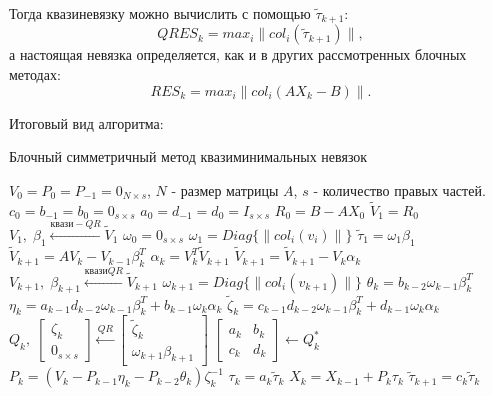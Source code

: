 Тогда квазиневязку можно вычислить с помощью $\tilde{\tau}_{k+1}$:
$$QRES_k = max_i \| col_i (\tilde{\tau}_{k+1}) \|,$$
а настоящая невязка определяется, как и в других рассмотренных блочных методах:
$$RES_k = max_i \| col_i (AX_k - B) \|.$$

Итоговый вид алгоритма:
\begin{algorithm}[H]
    \caption{Блочный симметричный метод квазиминимальных невязок}
    \begin{algorithmic}[1]
        \State $V_0 = P_{0} = P_{-1} = 0_{N \times s}$, $N$ - размер матрицы $A$, $s$ - количество правых частей.
        \State $c_0 = b_{-1} = b_0 = 0_{s \times s}$
        \State $a_0 = d_{-1} = d_0 = I_{s \times s}$
        \State $R_0 = B - AX_0$
        \State $\tilde{V}_1 = R_0$
        \State $V_1,\; \beta_1 \xleftarrow{квази-QR} \tilde{V}_1 $
        \State $\omega_0 = 0_{s\times s}$
        \State $\omega_1 = Diag\{ \| col_i (v_i) \| \}$
        \State $\tilde{\tau}_1 = \omega_1 \beta_1$
            \State $\tilde{V}_{k+1} = AV_k - V_{k-1} \beta^T_{k}$
            \State $\alpha_k = V_k^T \tilde{V}_{k+1}$
            \State $\tilde{V}_{k+1} = \tilde{V}_{k+1} - V_k \alpha_k$
            \State $ V_{k+1},\; \beta_{k+1} \xleftarrow{квази QR} \tilde{V}_{k+1} $
            \State $\omega_{k+1} = Diag\{ \| col_i (v_{k+1}) \| \}$
            \State $\theta_k = b_{k-2} \omega_{k-1} \beta_k^T $
            \State $\eta_k = a_{k-1}d_{k-2} \omega_{k-1} \beta^T_{k} + b_{k-1} \omega_k \alpha_k$
            \State $\tilde{\zeta}_k = c_{k-1} d_{k-2} \omega_{k-1} \beta_{k}^T + d_{k-1} \omega_k \alpha_k$
            \State $ Q_k ,\; 
                    \begin{bmatrix}
                        \zeta_k \\
                        0_{s \times s}
                    \end{bmatrix} \xleftarrow{QR} \begin{bmatrix}
                                        \tilde{\zeta}_k \\
                                        \omega_{k+1} \beta_{k+1}
                                     \end{bmatrix}$
            \State $\begin{bmatrix}
                        a_k & b_k \\
                        c_k & d_k
                    \end{bmatrix} \gets Q_k^*$
            \State $P_k = (V_k - P_{k-1}\eta_k - P_{k-2} \theta_k)\zeta_k^{-1}$
            \State $\tau_k = a_k \tilde{\tau}_k$
            \State $X_k = X_{k-1} + P_{k} \tau_{k}$
            \State $\tilde{\tau}_{k+1} = c_k \tilde{\tau}_k$
        \EndFor
    \end{algorithmic}
\end{algorithm}

